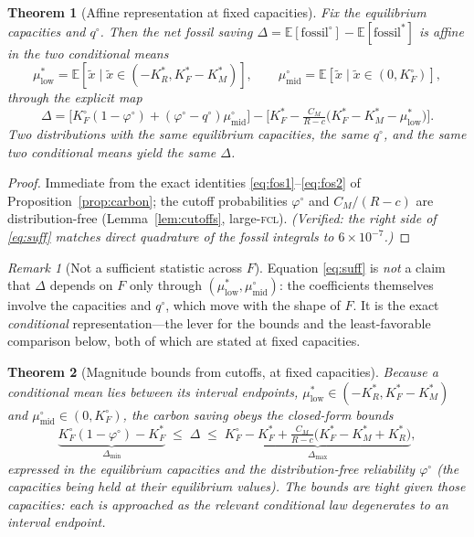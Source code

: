 \documentclass[11pt,reqno]{amsart}
\theoremstyle{plain}
\newtheorem{theorem}{Theorem}
\theoremstyle{definition}
\theoremstyle{remark}
\newtheorem{remark}{Remark}
\newcommand{\KRs}{K_R^{*}}
\newcommand{\KFs}{K_F^{*}}
\newcommand{\KMs}{K_M^{*}}
\newcommand{\KFo}{K_F^{\circ}}
\newcommand{\CM}{C_M}
\newcommand{\E}{\mathbb{E}}
\begin{document}
\begin{theorem}[Affine representation at fixed capacities]\label{thm:suffstat}
Fix the equilibrium capacities and $q^{\circ}$. Then the net fossil saving
$\Delta=\E[\text{fossil}^{\circ}]-\E[\text{fossil}^{*}]$ is \emph{affine} in the
two conditional means
\[
  \mu^{*}_{\mathrm{low}}=\E[\tilde x\mid \tilde x\in(-\KRs,\KFs-\KMs)],
  \qquad
  \mu^{\circ}_{\mathrm{mid}}=\E[\tilde x\mid \tilde x\in(0,\KFo)],
\]
through the explicit map
\begin{equation}\label{eq:suff}
  \Delta
  =\Big[\KFo(1-\varphi^{\circ})+(\varphi^{\circ}-q^{\circ})\mu^{\circ}_{\mathrm{mid}}\Big]
   -\Big[\KFs-\tfrac{\CM}{R-c}\big(\KFs-\KMs-\mu^{*}_{\mathrm{low}}\big)\Big].
\end{equation}
Two distributions with the same equilibrium capacities, the same $q^{\circ}$, and
the same two conditional means yield the same $\Delta$.
\end{theorem}

\begin{proof}
Immediate from the exact identities \eqref{eq:fos1}--\eqref{eq:fos2} of
Proposition~\ref{prop:carbon}; the cutoff probabilities $\varphi^{\circ}$ and
$\CM/(R-c)$ are distribution-free (Lemma~\ref{lem:cutoffs}, large-\textsc{fcl}).
\emph{(Verified: the right side of \eqref{eq:suff} matches direct quadrature of the
fossil integrals to $6\times10^{-7}$.)}
\end{proof}

\begin{remark}[Not a sufficient statistic across $F$]
Equation \eqref{eq:suff} is \emph{not} a claim that $\Delta$ depends on $F$ only
through $(\mu^{*}_{\mathrm{low}},\mu^{\circ}_{\mathrm{mid}})$: the coefficients
themselves involve the capacities and $q^{\circ}$, which move with the shape of
$F$. It is the exact \emph{conditional} representation---the lever for the bounds
and the least-favorable comparison below, both of which are stated at fixed
capacities.
\end{remark}

\begin{theorem}[Magnitude bounds from cutoffs, at fixed capacities]\label{thm:bounds}
Because a conditional mean lies between its interval endpoints,
$\mu^{*}_{\mathrm{low}}\in(-\KRs,\KFs-\KMs)$ and $\mu^{\circ}_{\mathrm{mid}}\in(0,\KFo)$,
the carbon saving obeys the closed-form bounds
\begin{equation}\label{eq:bounds}
  \underbrace{\KFo(1-\varphi^{\circ})-\KFs}_{\Delta_{\min}}
  \;\le\;\Delta\;\le\;
  \underbrace{\KFo-\KFs+\tfrac{\CM}{R-c}\big(\KFs-\KMs+\KRs\big)}_{\Delta_{\max}},
\end{equation}
expressed in the equilibrium capacities and the distribution-free reliability
$\varphi^{\circ}$ (the capacities being held at their equilibrium values). The
bounds are tight given those capacities: each is approached as the relevant
conditional law degenerates to an interval endpoint.
\end{theorem}
\end{document}
